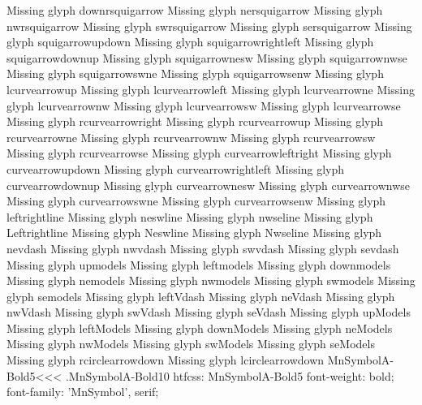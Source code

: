 Missing glyph	downrsquigarrow
Missing glyph	nersquigarrow
Missing glyph	nwrsquigarrow
Missing glyph	swrsquigarrow
Missing glyph	sersquigarrow
Missing glyph	squigarrowupdown
Missing glyph	squigarrowrightleft
Missing glyph	squigarrowdownup
Missing glyph	squigarrownesw
Missing glyph	squigarrownwse
Missing glyph	squigarrowswne
Missing glyph	squigarrowsenw
Missing glyph	lcurvearrowup
Missing glyph	lcurvearrowleft
Missing glyph	lcurvearrowne
Missing glyph	lcurvearrownw
Missing glyph	lcurvearrowsw
Missing glyph	lcurvearrowse
Missing glyph	rcurvearrowright
Missing glyph	rcurvearrowup
Missing glyph	rcurvearrowne
Missing glyph	rcurvearrownw
Missing glyph	rcurvearrowsw
Missing glyph	rcurvearrowse
Missing glyph	curvearrowleftright
Missing glyph	curvearrowupdown
Missing glyph	curvearrowrightleft
Missing glyph	curvearrowdownup
Missing glyph	curvearrownesw
Missing glyph	curvearrownwse
Missing glyph	curvearrowswne
Missing glyph	curvearrowsenw
Missing glyph	leftrightline
Missing glyph	neswline
Missing glyph	nwseline
Missing glyph	Leftrightline
Missing glyph	Neswline
Missing glyph	Nwseline
Missing glyph	nevdash
Missing glyph	nwvdash
Missing glyph	swvdash
Missing glyph	sevdash
Missing glyph	upmodels
Missing glyph	leftmodels
Missing glyph	downmodels
Missing glyph	nemodels
Missing glyph	nwmodels
Missing glyph	swmodels
Missing glyph	semodels
Missing glyph	leftVdash
Missing glyph	neVdash
Missing glyph	nwVdash
Missing glyph	swVdash
Missing glyph	seVdash
Missing glyph	upModels
Missing glyph	leftModels
Missing glyph	downModels
Missing glyph	neModels
Missing glyph	nwModels
Missing glyph	swModels
Missing glyph	seModels
Missing glyph	rcirclearrowdown
Missing glyph	lcirclearrowdown
\<MnSymbolA-Bold5\><<<
.MnSymbolA-Bold10
htfcss:  MnSymbolA-Bold5  font-weight: bold; font-family: 'MnSymbol', serif;

